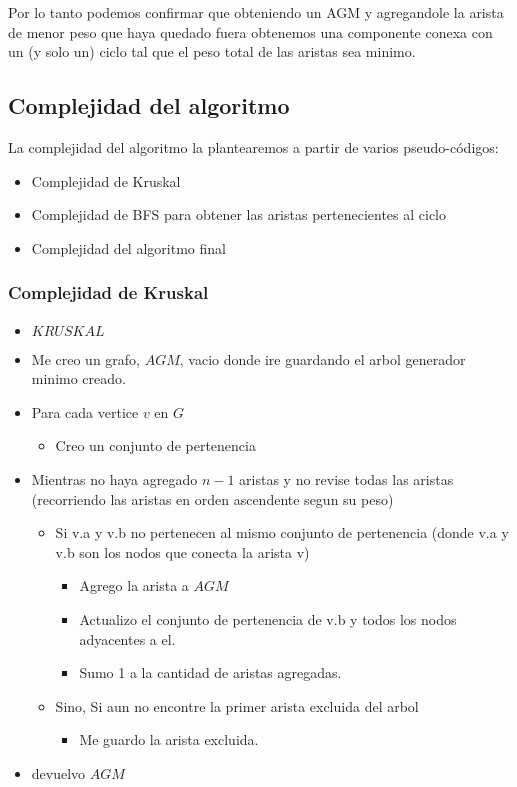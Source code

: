 Por lo tanto podemos confirmar que obteniendo un AGM y agregandole la arista de menor peso que haya quedado fuera obtenemos una componente conexa con un (y solo un) ciclo tal que el peso total de las aristas sea minimo.


\newpage

\subsection{Complejidad del algoritmo}

La complejidad del algoritmo la plantearemos a partir de varios pseudo-códigos:

\begin{itemize}
\item Complejidad de Kruskal
\item Complejidad de BFS para obtener las aristas pertenecientes al ciclo
\item Complejidad del algoritmo final
\end{itemize}

\subsubsection{Complejidad de Kruskal}


\begin{itemize}
\item $KRUSKAL$
\item Me creo un grafo, $AGM$, vacio donde ire guardando el arbol generador minimo creado.
\item Para cada vertice $v$ en $G$
	\begin{itemize}
	\item Creo un conjunto de pertenencia
	\end{itemize}
\item Mientras no haya agregado $n-1$ aristas y no revise todas las aristas (recorriendo las aristas en orden ascendente segun su peso)
	\begin{itemize}
	\item Si v.a y v.b no pertenecen al mismo conjunto de pertenencia (donde v.a y v.b son los nodos que conecta la arista v)
		\begin{itemize}
		\item Agrego la arista a $AGM$
		\item Actualizo el conjunto de pertenencia de v.b y todos los nodos adyacentes a el.
		\item Sumo 1 a la cantidad de aristas agregadas.
		\end{itemize}
	\item Sino, Si aun no encontre la primer arista excluida del arbol
		\begin{itemize}
		\item Me guardo la arista excluida.
		\end{itemize}
	\end{itemize}
\item devuelvo $AGM$
\end{itemize}


